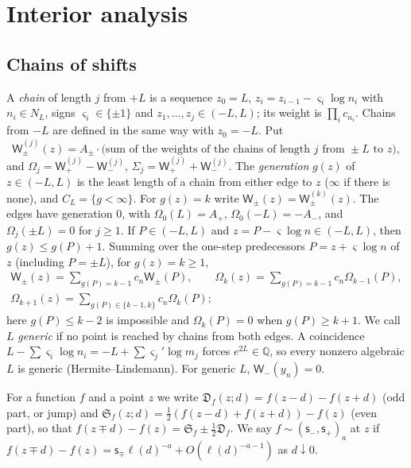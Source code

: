 \documentclass[11pt]{amsart}
\newcommand{\Dj}{\mathfrak{D}}
\newcommand{\Sj}{\mathfrak{S}}
\theoremstyle{definition}
\theoremstyle{remark}
\numberwithin{equation}{section}
\begin{document}
\section{Interior analysis}\label{sec:interior}

\subsection{Chains of shifts}\label{sec:chains}
A \emph{chain} of length $j$ from $+L$ is a sequence $z_0=L$, $z_i=z_{i-1}-\varsigma_i\log n_i$ with $n_i\in N_L$, signs $\varsigma_i\in\{\pm1\}$ and $z_1,\dots,z_j\in(-L,L)$; its weight is $\prod_ic_{n_i}$. Chains from $-L$ are defined in the same way with $z_0=-L$. Put
\[
\mathsf W^{(j)}_\pm(z)=A_\pm\cdot\bigl(\text{sum of the weights of the chains of length }j\text{ from }\pm L\text{ to }z\bigr),
\]
and $\Omega_j=\mathsf W^{(j)}_+-\mathsf W^{(j)}_-$, $\Sigma_j=\mathsf W^{(j)}_++\mathsf W^{(j)}_-$.
The \emph{generation} $g(z)$ of $z\in(-L,L)$ is the least length of a chain from either edge to $z$ ($\infty$ if there is none), and $C_L=\{g<\infty\}$. For $g(z)=k$ write $\mathsf W_\pm(z)=\mathsf W^{(k)}_\pm(z)$. The edges have generation $0$, with $\Omega_0(L)=A_+$, $\Omega_0(-L)=-A_-$, and $\Omega_j(\pm L)=0$ for $j\ge1$. If $P\in(-L,L)$ and $z=P-\varsigma\log n\in(-L,L)$, then $g(z)\le g(P)+1$. Summing over the one-step predecessors $P=z+\varsigma\log n$ of $z$ (including $P=\pm L$), for $g(z)=k\ge1$,
\begin{equation}\label{eq:chain}
\begin{gathered}
\mathsf W_\pm(z)=\sum_{g(P)=k-1}c_n\mathsf W_\pm(P),\qquad\Omega_k(z)=\sum_{g(P)=k-1}c_n\Omega_{k-1}(P),\\
\Omega_{k+1}(z)=\sum_{g(P)\in\{k-1,k\}}c_n\Omega_k(P);
\end{gathered}
\end{equation}
here $g(P)\le k-2$ is impossible and $\Omega_k(P)=0$ when $g(P)\ge k+1$. We call $L$ \emph{generic} if no point is reached by chains from both edges. A coincidence $L-\sum\varsigma_i\log n_i=-L+\sum\varsigma_j'\log m_j$ forces $e^{2L}\in\mathbb Q$, so every nonzero algebraic $L$ is generic (Hermite--Lindemann). For generic $L$, $\mathsf W_-(y_n)=0$.

For a function $f$ and a point $z$ we write $\Dj_f(z;d)=f(z-d)-f(z+d)$ (odd part, or jump) and $\Sj_f(z;d)=\frac12(f(z-d)+f(z+d))-f(z)$ (even part), so that $f(z\mp d)-f(z)=\Sj_f\pm\frac12\Dj_f$. We say $f\sim(\mathsf s_-,\mathsf s_+)_a$ at $z$ if $f(z\mp d)-f(z)=\mathsf s_\mp\ell(d)^{-a}+O(\ell(d)^{-a-1})$ as $d\downarrow0$.
\end{document}
